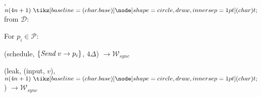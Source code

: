 \begin{bbox}[title={$\F_{\msf{bcast}} (\mathcal{D}, \mathcal{P}=p_1,...,p_n)$}]

\OnInput {}, $n(4n+1) \token$ from $\mathcal{D}$:
	\begin{renumerate}
	\item For $p_i \in \mathcal{P}$:
		\begin{ritemize}	
		\item \Send (schedule, $\{\emph{Send}~ v \rightarrow p_i\}$, $4 \Delta$) $\rightarrow \mathcal{W}_{sync}$
		\end{ritemize}

	\item \Send (leak, (input, $v$), $n(4n+1) \token$) $\rightarrow \mathcal{W}_{sync}$
	\end{renumerate}

\end{bbox}
